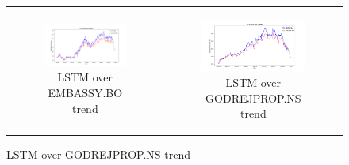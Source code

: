 \documentclass[11pt]{article}
\begin{document}
\begin{figure}[h!]
    \centering
    \begin{tabular}{cc}
        \begin{subfigure}[b]{0.48\textwidth}
            \centering
            \includegraphics[width=\linewidth]{figures/lstm/EMBASSY_predict.png}
            \caption{LSTM over EMBASSY.BO trend}
            \label{fig:1a}
        \end{subfigure} &
        \begin{subfigure}[b]{0.48\textwidth}
            \centering
            \includegraphics[width=\linewidth]{figures/lstm/GODREJPROP_predict.png}
            \caption{LSTM over GODREJPROP.NS trend}
            \label{fig:1b}
        \end{subfigure} \\
        

\end{tabular}
\end{figure}
\end{document}
